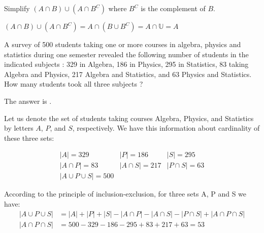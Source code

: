 \documentclass{ximera}
\begin{document}
\begin{question}
Simplify $(A \cap B) \cup (A \cap B^C)$ where $B^C$ is the complement of $B$.
\begin{solution}
\begin{multiple-choice}
  \choice{$\emptyset$}
\end{multiple-choice}
\end{solution}
$(A \cap B) \cup (A \cap B^C) = A \cap (B \cup B^C) = A \cap \mathbb{U} = A$
\end{question}

\begin{question}
A survey of 500 students taking one or more courses in algebra,
physics and statistics during one semester revealed the following
number of students in the indicated subjects : 329 in Algebra, 186 in
Physics, 295 in Statistics, 83 taking Algebra and Physics, 217 Algebra
and Statistics, and 63 Physics and Statistics.  How many students took
all three subjects ?
\begin{solution}
The answer is . 
\end{solution}

Let us denote the set of students taking courses Algebra, Physics, and
Statistics by letters $A$, $P$, and $S$, respectively. We have this
information about cardinality of these three sets:

\begin{equation*}
	\begin{array}{lll}
	 |A| = 329							& |P| = 186				& |S| = 295 \\
	 |A \cap P| = 83				& |A \cap S| = 217	& |P \cap S| = 63 \\
	 |A \cup P \cup S| = 500	& &
	\end{array}
\end{equation*}

According to the principle of inclusion-exclusion, for three sets A, P and S we have:
\begin{align*}
|A \cup P \cup S| &= |A| + |P| + |S| - |A \cap P| - |A \cap S| - |P \cap S| + |A \cap P \cap S|\\
|A \cap P \cap S| &= 500 - 329 - 186 - 295 + 83 + 217 + 63 = 53
\end{align*}
\end{question}
\end{document}
